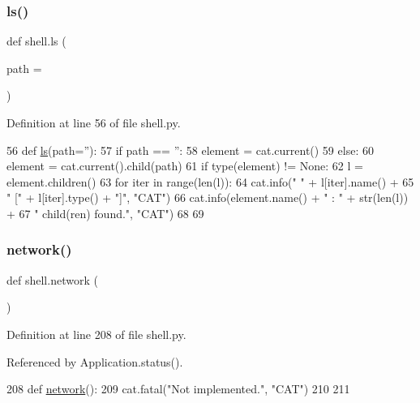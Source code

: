 \subsubsection{\texorpdfstring{ls()}{ls()}}
{\footnotesize\ttfamily def shell.\+ls (\begin{DoxyParamCaption}\item[{}]{path = {\ttfamily \textquotesingle{}\textquotesingle{}} }\end{DoxyParamCaption})}



Definition at line 56 of file shell.\+py.


\begin{DoxyCode}
56 \textcolor{keyword}{def }\hyperlink{namespaceshell_aa9b05ca51c55671aa9ce6973d3c68049}{ls}(path=''):
57   \textcolor{keywordflow}{if} path == \textcolor{stringliteral}{''}:
58     element = cat.current()
59   \textcolor{keywordflow}{else}:
60     element = cat.current().child(path)
61   \textcolor{keywordflow}{if} type(element) != \textcolor{keywordtype}{None}:
62     l = element.children()
63     \textcolor{keywordflow}{for} iter \textcolor{keywordflow}{in} range(len(l)):
64       cat.info(\textcolor{stringliteral}{"    "} + l[iter].name() +
65                \textcolor{stringliteral}{" ["} + l[iter].type() + \textcolor{stringliteral}{"]"}, \textcolor{stringliteral}{"CAT"})
66     cat.info(element.name() + \textcolor{stringliteral}{" :  "} + str(len(l)) +
67              \textcolor{stringliteral}{" child(ren) found."}, \textcolor{stringliteral}{"CAT"})
68 
69 
\end{DoxyCode}
\mbox{\label{namespaceshell_ac644e906d4031b3ab30adb8e1984b252}} 
\subsubsection{\texorpdfstring{network()}{network()}}
{\footnotesize\ttfamily def shell.\+network (\begin{DoxyParamCaption}{ }\end{DoxyParamCaption})}



Definition at line 208 of file shell.\+py.



Referenced by Application.\+status().


\begin{DoxyCode}
208 \textcolor{keyword}{def }\hyperlink{namespaceshell_ac644e906d4031b3ab30adb8e1984b252}{network}():
209   cat.fatal(\textcolor{stringliteral}{"Not implemented."}, \textcolor{stringliteral}{"CAT"})
210 
211 
\end{DoxyCode}
\mbox{\label{namespaceshell_a7c2aab80550f476d91e0d8f0c350a635}} 
